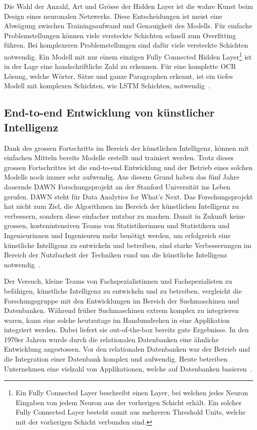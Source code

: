 Die Wahl der Anzahl, Art und Grösse der Hidden Layer ist die wahre Kunst beim Design eines neuronalen Netzwerks. Diese Entscheidungen ist meist eine Abwägung zwischen Trainingsaufwand und Genauigkeit des Modells. Für einfache Problemstellungen können viele versteckte Schichten schnell zum Overfitting führen. Bei komplexeren Problemstellungen sind dafür viele versteckte Schichten notwendig. Ein Modell mit nur einem einzigen Fully Connected Hidden Layer\footnote{Ein Fully Connected Layer beschreibt einen Layer, bei welchen jedes Neuron Eingaben von jedem Neuron aus der vorherigen Schicht erhält. Ein solcher Fully Connected Layer besteht somit aus mehreren Threshold Units, welche mit der vorherigen Schicht verbunden sind.} ist in der Lage eine handschriftliche Zahl zu erkennen. Für eine komplette OCR Lösung, welche Wörter, Sätze und ganze Paragraphen erkennt, ist ein tiefes Modell mit komplexen Schichten, wie LSTM Schichten, notwendig~\autocite{NNDesign}.

\subsection{End-to-end Entwicklung von künstlicher Intelligenz}
\label{chap:DAWN}

Dank des grossen Fortschritts im Bereich der künstlichen Intelligenz, können mit einfachen Mitteln bereits Modelle erstellt und trainiert werden. Trotz dieses grossen Fortschrittes ist die end-to-end Entwicklung und der Betrieb eines solchen Modells noch immer sehr aufwendig. Aus diesem Grund haben \textcite{DAWN} das fünf Jahre dauernde DAWN Forschungsprojekt an der Stanford Universität ins Leben gerufen. DAWN steht für Data Analytics for What's Next. Das Forschungsprojekt hat nicht zum Ziel, die Algorithmen im Bereich der künstlichen Intelligenz zu verbessern, sondern diese einfacher nutzbar zu machen. Damit in Zukunft keine grossen, kostenintensiven Teams von Statistikerinnen und Statistikern und Ingenieurinnen und Ingenieuren mehr benötigt werden, um erfolgreich eine künstliche Intelligenz zu entwickeln und betreiben, sind starke Verbesserungen im Bereich der Nutzbarkeit der Techniken rund um die künstliche Intelligenz notwendig~\autocite{DAWN}.

Der Versuch, kleine Teams von Fachspezialistinnen und Fachspezialisten zu befähigen, künstliche Intelligenz zu entwickeln und zu betreiben, vergleicht die Forschungsgruppe mit den Entwicklungen im Bereich der Suchmaschinen und Datenbanken. Während früher Suchmaschinen extrem komplex zu integrieren waren, kann eine solche heutzutage im Handumdrehen in eine Applikation integriert werden. Dabei liefert sie out-of-the-box bereits gute Ergebnisse. In den 1970er Jahren wurde durch die relationalen Datenbanken eine ähnliche Entwicklung angestossen. Vor den relationalen Datenbanken war der Betrieb und die Integration einer Datenbank komplex und aufwendig. Heute betreiben Unternehmen eine vielzahl von Applikationen, welche auf Datenbanken basieren~\autocite{DAWN}.

